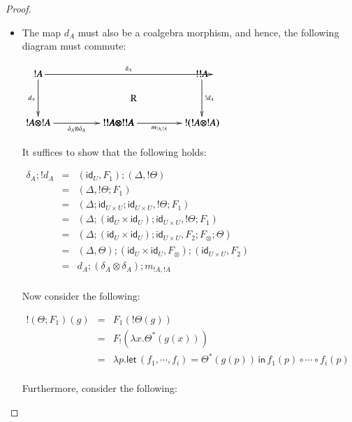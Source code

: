 \documentclass{elsarticle}
\newcommand{\id}[0]{\mathsf{id}}
\newcommand{\lett}[0]{\mathsf{let}\,}
\newcommand{\inn}[0]{\,\mathsf{in}\,}
\begin{document}
\begin{proof}
\begin{report}
\begin{itemize}
  \item The map $d_A$ must also be a coalgebra morphism, and hence,
    the following diagram must commute:
    \begin{center}
      \begin{math}
        \bfig
        \morphism(40,500)<1780,0>[`;\delta_{A}]
        \hSquares/``->``->`->`->/[!A``!!A`!A \otimes !A`!!A \otimes !!A`!(!A \otimes !A);``d_A``!d_A`\delta_A \otimes \delta_A`m_{!A,!A}]
        \place(980,250)[\text{R}]        
        \efig                
      \end{math}
    \end{center}
    It suffices to show that the following holds:
    \begin{center}
      \begin{math}
        \begin{array}{lll}
          \delta_A;!d_A
          & = & (\id_U,F_1);(\Delta,!\Theta)\\
          & = & (\Delta,!\Theta;F_1)\\
          & = & (\Delta;\id_{U \times U};\id_{U \times U},!\Theta;F_1)\\
          & = & (\Delta;(\id_{U} \times \id_{U});\id_{U \times U},!\Theta;F_1)\\
          & = & (\Delta;(\id_{U} \times \id_{U});\id_{U \times U},F_2;F_\otimes;\Theta)\\
          & = & (\Delta,\Theta);(\id_{U} \times \id_{U},F_\otimes);(\id_{U \times U},F_2)\\
          & = & d_A;(\delta_A \otimes \delta_A);m_{!A,!A}\\
        \end{array}
      \end{math}
    \end{center}
    Now consider the following:
    \begin{center}
      \begin{math}
        \begin{array}{lll}
          !(\Theta;F_1)(g)
          & = & F_1(!\Theta(g))\\
          & = & F_!(\lambda x.\Theta^*(g(x)))\\
          & = & \lambda p.\lett (f_1,\cdots,f_i) = \Theta^*(g(p)) \inn f_1(p) \circ \cdots \circ f_i(p)\\          
        \end{array}
      \end{math}
    \end{center}
    Furthermore, consider the following:

\end{itemize}
\end{report}
\end{proof}
\end{document}
